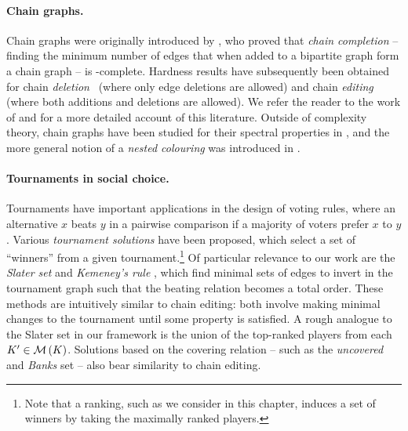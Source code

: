 \paragraph{Chain graphs.}
%
Chain graphs were originally introduced by \textcite{yannakakis1981computing}, who
proved that \emph{chain completion} -- finding the minimum number of edges that
when added to a bipartite graph form a chain graph -- is
-complete. Hardness results have subsequently been obtained
for chain \emph{deletion}~\cite{natanzon2001complexity} (where only edge
deletions are allowed) and chain \emph{editing}~\cite{drange2015threshold}
(where both additions and deletions are allowed). We refer the reader to the
work of \textcite{jiao2017algorithms} and \textcite{drange2015threshold} for a more
detailed account of this literature.
%
Outside of complexity theory, chain graphs have been studied for their spectral
properties in \cite{andelic_2015,ghorbani2017spectral}, and the more general
notion of a \emph{nested colouring} was introduced in \cite{cook2015nested}.

\paragraph{Tournaments in social choice.}
%
Tournaments have important applications in the design of voting rules, where an
alternative $x$ beats $y$ in a pairwise comparison if a majority of voters
prefer $x$ to $y$.  Various \emph{tournament solutions} have been proposed,
which select a set of ``winners'' from a given tournament.\footnote{Note that a
ranking, such as we consider in this chapter, induces a set of winners by taking
the maximally ranked players.}
%
Of particular relevance to our work are the \emph{Slater set} and
\emph{Kemeney's rule} \cite{brandt2016a}, which find minimal sets of edges to
invert in the tournament graph such that the beating relation becomes a total
order.\footnotemark{}
These methods are intuitively similar to chain editing: both
involve making minimal changes to the tournament until some property is
satisfied. A rough analogue to the Slater set in our framework is the union of
the top-ranked players from each $K' \in \operatorname{\mathcal{M}}\left({K}\right)$. Solutions based on the
covering relation -- such as the \emph{uncovered} and \emph{Banks} set
\cite{brandt2016a} -- also bear similarity to chain editing.


